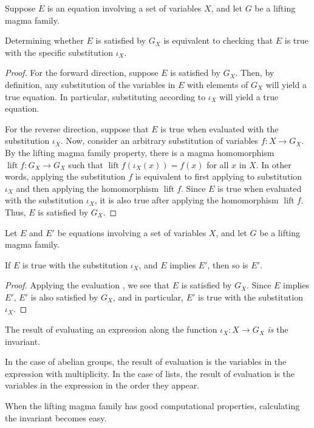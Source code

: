 \begin{theorem}\leanok\label{lifting-magma-basis-evaluation}
	Suppose $E$ is an equation involving a set of variables $X$, and let $G$ be a lifting magma family.

	Determining whether $E$ is satisfied by $G_X$ is equivalent to checking that $E$ is true with the specific substitution $\iota_X$.

\end{theorem}
\begin{proof}
	For the forward direction, suppose $E$ is satisfied by $G_X$. Then, by definition, any substitution of the variables in $E$ with elements of $G_X$ will yield a true equation. In particular, substituting according to $\iota_X$ will yield a true equation.

	For the reverse direction, suppose that $E$ is true when evaluated with the substitution $\iota_X$. Now, consider an arbitrary substitution of variables $f : X \to G_X$. By the lifting magma family property, there is a magma homomorphism $\operatorname{lift}{f} : G_X \to G_X$ such that $\operatorname{lift}{f}(\iota_X(x)) = f(x)$ for all $x$ in $X$. In other words, applying the substitution $f$ is equivalent to first applying to substitution $\iota_X$ and then applying the homomorphism $\operatorname{lift}{f}$. Since $E$ is true when evaluated with the substitution $\iota_X$, it is also true after applying the homomorphism $\operatorname{lift}{f}$. Thus, $E$ is satisfied by $G_X$.
\end{proof}

\begin{theorem}\label{fundamental-property-of-invariants}
	Let $E$ and $E'$ be equations involving a set of variables $X$, and let $G$ be a lifting magma family.

	If $E$ is true with the substitution $\iota_X$, and $E$ implies $E'$, then so is $E'$.
\end{theorem}
\begin{proof}
	Applying the evaluation , we see that $E$ is satisfied by $G_X$. Since $E$ implies $E'$, $E'$ is also satisfied by $G_X$, and in particular, $E'$ is true with the substitution $\iota_X$.
\end{proof}

\begin{remark}
	The result of evaluating an expression along the function $\iota_X : X \to G_X$ \emph{is} the invariant.

	In the case of abelian groups, the result of evaluation is the variables in the expression with multiplicity.
	In the case of lists, the result of evaluation is the variables in the expression in the order they appear.

	When the lifting magma family has good computational properties, calculating the invariant becomes easy.
\end{remark}

